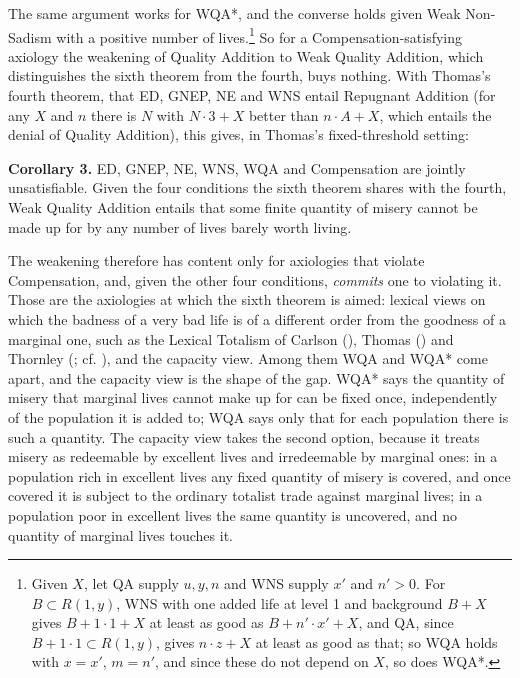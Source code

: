 \documentclass[
  11pt,
  letterpaper,
  DIV=11,
  numbers=noendperiod,
  twoside]{scrartcl}
\begin{document}
The same argument works for WQA*, and the converse holds given Weak
Non-Sadism with a positive number of lives.\footnote{Given \(X\), let QA
  supply \(u, y, n\) and WNS supply \(x'\) and \(n' > 0\). For
  \(B \subset R(1,y)\), WNS with one added life at level 1 and
  background \(B + X\) gives \(B + 1 \cdot 1 + X\) at least as good as
  \(B + n' \cdot x' + X\), and QA, since
  \(B + 1 \cdot 1 \subset R(1,y)\), gives \(n \cdot z + X\) at least as
  good as that; so WQA holds with \(x = x'\), \(m = n'\), and since
  these do not depend on \(X\), so does WQA*.} So for a
Compensation-satisfying axiology the weakening of Quality Addition to
Weak Quality Addition, which distinguishes the sixth theorem from the
fourth, buys nothing. With Thomas's fourth theorem, that ED, GNEP, NE
and WNS entail Repugnant Addition (for any \(X\) and \(n\) there is
\(N\) with \(N \cdot 3 + X\) better than \(n \cdot A + X\), which
entails the denial of Quality Addition), this gives, in Thomas's
fixed-threshold setting:

\textbf{Corollary 3.} ED, GNEP, NE, WNS, WQA and Compensation are
jointly unsatisfiable. Given the four conditions the sixth theorem
shares with the fourth, Weak Quality Addition entails that some finite
quantity of misery cannot be made up for by any number of lives barely
worth living.

The weakening therefore has content only for axiologies that violate
Compensation, and, given the other four conditions, \emph{commits} one
to violating it. Those are the axiologies at which the sixth theorem is
aimed: lexical views on which the badness of a very bad life is of a
different order from the goodness of a marginal one, such as the Lexical
Totalism of Carlson (), Thomas
() and Thornley
(; cf.
), and the capacity view.
Among them WQA and WQA* come apart, and the capacity view is the shape
of the gap. WQA* says the quantity of misery that marginal lives cannot
make up for can be fixed once, independently of the population it is
added to; WQA says only that for each population there is such a
quantity. The capacity view takes the second option, because it treats
misery as redeemable by excellent lives and irredeemable by marginal
ones: in a population rich in excellent lives any fixed quantity of
misery is covered, and once covered it is subject to the ordinary
totalist trade against marginal lives; in a population poor in excellent
lives the same quantity is uncovered, and no quantity of marginal lives
touches it.
\end{document}
